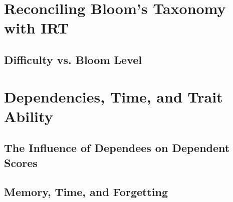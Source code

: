\section{Reconciling Bloom's Taxonomy with IRT}

\subsection{Difficulty vs. Bloom Level}

\section{Dependencies, Time, and Trait Ability}

\subsection{The Influence of Dependees on Dependent Scores}
\subsection{Memory, Time, and Forgetting}

